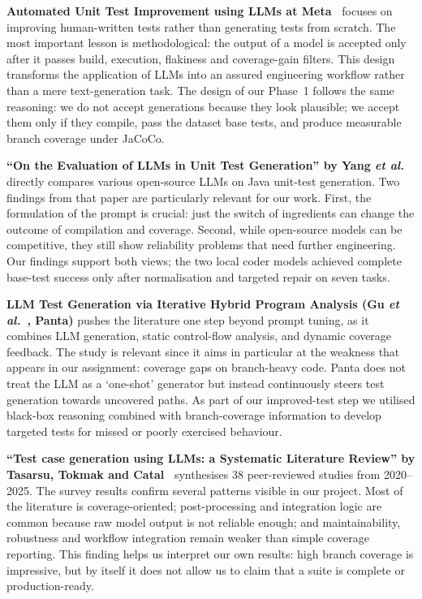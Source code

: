 \documentclass[journal]{IEEEtran}
\begin{document}
\textbf{Automated Unit Test Improvement using LLMs at
Meta~\cite{metatestgen}} focuses on improving human-written tests rather
than generating tests from scratch. The most important lesson is
methodological: the output of a model is accepted only after it passes
build, execution, flakiness and coverage-gain filters. This design
transforms the application of LLMs into an assured engineering workflow
rather than a mere text-generation task. The design of our Phase~1
follows the same reasoning: we do not accept generations because they
look plausible; we accept them only if they compile, pass the dataset
base tests, and produce measurable branch coverage under JaCoCo.

\textbf{``On the Evaluation of LLMs in Unit Test Generation'' by Yang
\emph{et al.}~\cite{yang2024}} directly compares various open-source LLMs
on Java unit-test generation. Two findings from that paper are
particularly relevant for our work. First, the formulation of the prompt
is crucial: just the switch of ingredients can change the outcome of
compilation and coverage. Second, while open-source models can be
competitive, they still show reliability problems that need further
engineering. Our findings support both views; the two local coder models
achieved complete base-test success only after normalisation and
targeted repair on seven tasks.

\textbf{LLM Test Generation via Iterative Hybrid Program Analysis (Gu
\emph{et al.}~\cite{panta2024}, Panta)} pushes the literature one step
beyond prompt tuning, as it combines LLM generation, static control-flow
analysis, and dynamic coverage feedback. The study is relevant since it
aims in particular at the weakness that appears in our assignment:
coverage gaps on branch-heavy code. Panta does not treat the LLM as a
`one-shot' generator but instead continuously steers test generation
towards uncovered paths. As part of our improved-test step we utilised
black-box reasoning combined with branch-coverage information to
develop targeted tests for missed or poorly exercised behaviour.

\textbf{``Test case generation using LLMs: a Systematic Literature
Review'' by Tasarsu, Tokmak and Catal~\cite{lit_review}} synthesises 38
peer-reviewed studies from 2020--2025. The survey results confirm
several patterns visible in our project. Most of the literature is
coverage-oriented; post-processing and integration logic are common
because raw model output is not reliable enough; and maintainability,
robustness and workflow integration remain weaker than simple coverage
reporting. This finding helps us interpret our own results: high branch
coverage is impressive, but by itself it does not allow us to claim that
a suite is complete or production-ready.
\end{document}
